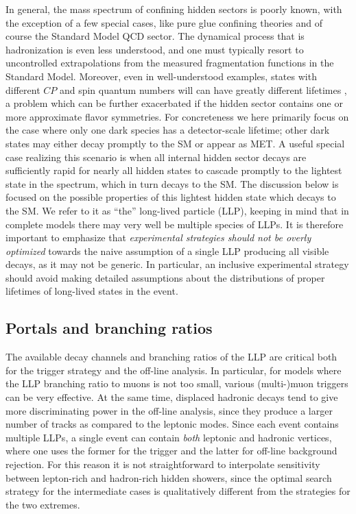 In general, the mass spectrum of confining hidden sectors is poorly known, with the exception of a few special cases, like pure glue confining theories \cite{Morningstar:1999rf} and of course the Standard Model QCD sector. The dynamical process that is hadronization is even less understood, and one must typically resort to uncontrolled extrapolations from the measured fragmentation functions in the Standard Model. Moreover, even in well-understood examples,  states with different $CP$ and spin  quantum numbers will can have greatly different lifetimes \cite{Strassler:2006im,Juknevich:2009ji,Juknevich:2009gg}, a problem which can be further exacerbated if the hidden sector contains one or more approximate flavor symmetries. For concreteness we here primarily focus on the case where only one dark species has a detector-scale lifetime; other dark states may either  decay promptly to the SM or appear as MET.
A useful special case realizing this scenario is when all internal hidden sector decays are sufficiently rapid for nearly all hidden states to cascade promptly to the lightest state in the spectrum, which in turn decays to the SM. The discussion below is focused on the possible properties of this lightest hidden state which decays to the SM. We refer to it as ``the'' long-lived particle (LLP), keeping in mind that in complete models there may very well be multiple species of LLPs. It is therefore important to emphasize that \emph{experimental strategies should not be overly optimized} towards the naive assumption of a single LLP producing all visible decays, as it may not be generic. In particular, an inclusive experimental strategy should avoid making detailed assumptions about the distributions of proper lifetimes of long-lived states in the event.  


\subsection{Portals and branching ratios}
\label{sec:darkshowerportal}

The available decay channels and branching ratios of the LLP are critical both for the trigger strategy and the off-line analysis. In particular, for models where the LLP branching ratio to muons is not too small,  various (multi-)muon triggers can be very effective. At the same time, displaced hadronic decays tend to give more discriminating power in the off-line analysis, since they produce a larger number of tracks as compared to the leptonic modes. Since each event contains multiple LLPs, a single event can contain \emph{both} leptonic and hadronic vertices, where one uses the former for the trigger and the latter for off-line background rejection. For this reason it is not straightforward to interpolate  sensitivity between lepton-rich and hadron-rich hidden showers, since the optimal search strategy for the intermediate cases is qualitatively different from the strategies for the two extremes.

